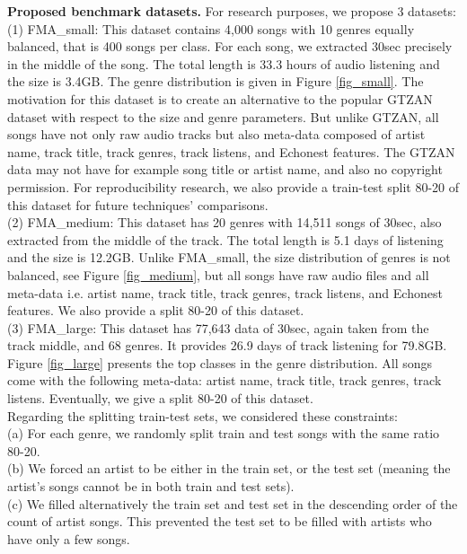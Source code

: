 \documentclass{article}
\begin{document}
  
 
\noindent
{\bf Proposed benchmark datasets.} For research purposes, we propose 3 datasets:\\
(1) FMA\_small: This dataset contains 4,000 songs with 10 genres equally balanced, that is 400 songs per class. For each song, we extracted 30sec precisely in the middle of the song. The total length is 33.3 hours of audio listening and the size is 3.4GB. The genre distribution is given in Figure \ref{fig_small}. The motivation for this dataset is to create an alternative to the popular GTZAN dataset with respect to the size and genre parameters. But unlike GTZAN, all songs have not only raw audio tracks but also meta-data composed of artist name, track title, track genres, track listens, and Echonest features. The GTZAN data may not have for example song title or artist name, and also no copyright permission. For reproducibility research, we also provide a train-test split 80-20 of this dataset for future techniques' comparisons.   \\
(2) FMA\_medium: This dataset has 20 genres with 14,511 songs of 30sec, also extracted from the middle of the track. The total length is 5.1 days of listening and the size is 12.2GB. Unlike FMA\_small, the size distribution of genres is not balanced, see Figure \ref{fig_medium}, but all songs have raw audio files and all meta-data i.e. artist name, track title, track genres, track listens, and Echonest features. We also provide a split 80-20 of this dataset.  \\
(3) FMA\_large: This dataset has 77,643 data of 30sec, again taken from the track middle, and 68 genres. It provides 26.9 days of track listening for 79.8GB. Figure \ref{fig_large} presents the top classes in the genre distribution. All songs come with the following meta-data: artist name, track title, track genres, track listens. Eventually, we give a split 80-20 of this dataset.\\


\noindent
Regarding the splitting train-test sets, we considered these constraints:\\
(a) For each genre, we randomly split train and test songs with the same ratio 80-20.\\
(b) We forced an artist to be either in the train set, or the test set (meaning the artist's songs cannot be in both train and test sets). \\
(c) We filled alternatively the train set and test set in the descending order of the count of artist songs. This prevented the test set to be filled with artists who have only a few songs.\\
\end{document}
